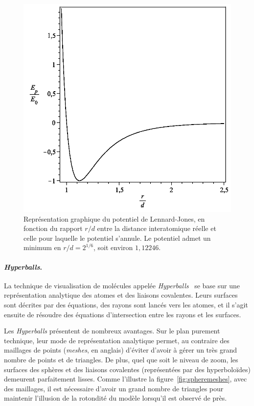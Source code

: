 	\begin{figure}[H]
    	\centering
    	\includegraphics[width=\textwidth]{figures/ch1/lennard-jones}
    	\caption{Représentation graphique du potentiel de Lennard-Jones, en fonction du rapport $r/d$ entre la distance interatomique réelle et celle pour laquelle le potentiel s'annule. Le potentiel admet un minimum en $r/d = 2^{1/6}$, soit environ $1,12246$.}
    	\label{fig:lennard}
	\end{figure}
		
	\paragraph{\emph{Hyperballs}.} La technique de visualisation de molécules appelée \emph{Hyperballs}~\cite{chavent2011gpu} se base sur une représentation analytique des atomes et des liaisons covalentes. Leurs surfaces sont décrites par des équations, des rayons sont lancés vers les atomes, et il s'agit ensuite de résoudre des équations d'intersection entre les rayons et les surfaces.
		
	Les \emph{Hyperballs} présentent de nombreux avantages. Sur le plan purement technique, leur mode de représentation analytique permet, au contraire des maillages de points (\emph{meshes}, en anglais) d'éviter d'avoir à gérer un très grand nombre de points et de triangles. De plus, quel que soit le niveau de zoom, les surfaces des sphères et des liaisons covalentes (représentées par des hyperboloïdes) demeurent parfaitement lisses. Comme l'illustre la figure~\ref{fig:spheremeshes}, avec des maillages, il est nécessaire d'avoir un grand nombre de triangles pour maintenir l'illusion de la rotondité du modèle lorsqu'il est observé de près.
		
